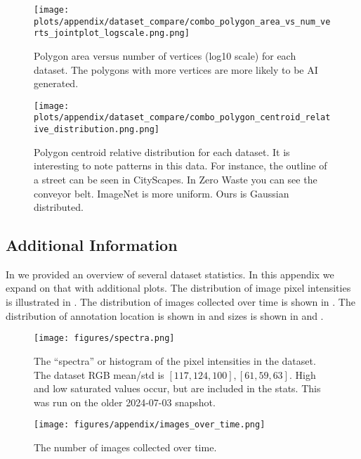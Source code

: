 \begin{figure*}[ht]
\centering
\texttt{[image: plots/appendix/dataset\_compare/combo\_polygon\_area\_vs\_num\_verts\_jointplot\_logscale.png.png]}
\caption[]{
    Polygon area versus number of vertices (log10 scale) for each dataset.
    The polygons with more vertices are more likely to be AI generated.
}
\label{fig:combo_polygon_area_vs_num_verts_jointplot}
\end{figure*}

\begin{figure*}[ht]
\centering
\texttt{[image: plots/appendix/dataset\_compare/combo\_polygon\_centroid\_relative\_distribution.png.png]}
\caption[]{
    Polygon centroid relative distribution for each dataset. It is interesting
    to note patterns in this data. For instance, the outline of a street can be
    seen in CityScapes. In Zero Waste you can see the conveyor belt. ImageNet
    is more uniform. Ours is Gaussian distributed. 
}
\label{fig:combo_polygon_centroid_relative_distribution}
\end{figure*}

\FloatBarrier


\subsection{Additional Information}
\label{sec:expanded_dataset}

In  we provided an overview of several dataset statistics.
In this appendix we expand on that with additional plots.
The distribution of image pixel intensities is illustrated in .
The distribution of images collected over time is shown in .
The distribution of annotation location is shown in  and sizes is shown
  in  and .


\begin{figure}[ht]
\centering
\texttt{[image: figures/spectra.png]}
\caption[]{
    The ``spectra'' or histogram of the pixel intensities in the dataset. 
    The dataset RGB mean/std is $[117, 124, 100], [61, 59, 63]$. 
    High and low saturated values occur, but are included in the stats.
    This was run on the older 2024-07-03 snapshot.
}
\label{fig:spectra}
\end{figure}


\begin{figure}[ht]
\centering
\texttt{[image: figures/appendix/images\_over\_time.png]}
\caption[]{
    The number of images collected over time.
}
\label{fig:images_over_time}
\end{figure}


